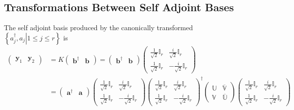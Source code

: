 \documentclass[aps, preprint]{revtex4}
\begin{document}
\subsection{Transformations Between Self Adjoint Bases}
\bigskip The self adjoint basis produced by the canonically transformed $\left \{\left .a_{j}^{ \dag } ,a_{j}\right \vert 1 \leq j \leq r\right \}$ is
\begin{align*}\left (\begin{array}{cc}\mathbf{y}_{1} & \mathbf{y}_{2}\end{array}\right ) &  =K \left (\begin{array}{cc}\mathbf{b}^{ \dag } & \mathbf{b}\end{array}\right ) =\left (\begin{array}{cc}\mathbf{b}^{ \dag } & \mathbf{b}\end{array}\right ) \left (\begin{array}{cc}\frac{1}{\sqrt{2}} \mathbb{I}_{r} & \frac{i}{\sqrt{2}} \mathbb{I}_{r} \\
\frac{1}{\sqrt{2}} \mathbb{I}_{r} &  -\frac{i}{\sqrt{2}} \mathbb{I}_{r}\end{array}\right ) \\
 &  =\left (\begin{array}{cc}\mathbf{a}^{ \dag } & \mathbf{a}\end{array}\right ) \left (\begin{array}{cc}\frac{1}{\sqrt{2}} \mathbb{I}_{r} & \frac{i}{\sqrt{2}} \mathbb{I}_{r} \\
\frac{1}{\sqrt{2}} \mathbb{I}_{r} &  -\frac{i}{\sqrt{2}} \mathbb{I}_{r}\end{array}\right ) \left (\begin{array}{cc}\frac{1}{\sqrt{2}} \mathbb{I}_{r} & \frac{i}{\sqrt{2}} \mathbb{I}_{r} \\
\frac{1}{\sqrt{2}} \mathbb{I}_{r} &  -\frac{i}{\sqrt{2}} \mathbb{I}_{r}\end{array}\right )^{ \dag } \left (\begin{array}{cc}\mathbb{U} & \overline{\mathbb{V}} \\
\mathbb{V} & \overline{\mathbb{U}}\end{array}\right ) \left (\begin{array}{cc}\frac{1}{\sqrt{2}} \mathbb{I}_{r} & \frac{i}{\sqrt{2}} \mathbb{I}_{r} \\
\frac{1}{\sqrt{2}} \mathbb{I}_{r} &  -\frac{i}{\sqrt{2}} \mathbb{I}_{r}\end{array}\right ) \\

\end{align*}
\end{document}
